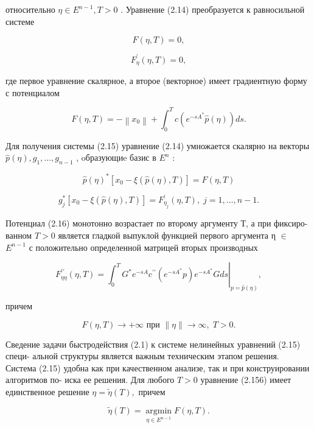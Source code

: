 \documentclass[10pt]{article}
\begin{document}
относительно \(\eta  \in  {E}^{n - 1},T > 0\) . Уравнение (2.14) преобразуется к равносильной системе

\[
F\left( {\eta ,T}\right)  = 0, \tag{2.15a}
\]

\[
{F}_{\eta }^{\prime }\left( {\eta ,T}\right)  = 0, \tag{2.156}
\]

где первое уравнение скалярное, а второе (векторное) имеет градиентную форму с потенциалом

\[
F\left( {\eta ,T}\right)  =  - \left\lVert {x}_{0} \right\rVert + {\int }_{0}^{T}c\left( {{e}^{-s{A}^{ * }}\widehat{p}\left( \eta \right) }\right) {ds}. \tag{2.16}
\]

Для получения системы (2.15) уравнение (2.14) умножается скалярно на векторы \(\widehat{p}\left( \eta \right) ,{g}_{1},\ldots ,{g}_{n - 1}\) , oбразующиe базис в \({E}^{n}\) :

\[
\widehat{p}{\left( \eta \right) }^{ * }\left[  {{x}_{0} - \xi \left( {\widehat{p}\left( \eta \right) ,T}\right) }\right]   = F\left( {\eta ,T}\right)
\]

\[
{g}_{j}^{ * }\left[  {{x}_{0} - \xi \left( {\widehat{p}\left( \eta \right) ,T}\right) }\right]   = {F}_{{\eta }_{j}}^{\prime }\left( {\eta ,T}\right) ,\;j = 1,\ldots ,n - 1.
\]

Потенциал (2.16) монотонно возрастает по второму аргументу Т, а при фиксиро- ванном \(T > 0\) является гладкой выпуклой функцией первого аргумента η \(\in\) \({E}^{n - 1}\) с положительно определенной матрицей вторых производных

\[
{F}_{\eta \eta }^{\prime \prime }\left( {\eta ,T}\right)  = {\left. {\int }_{0}^{T}{G}^{ * }{e}^{-{sA}}{c}^{\prime \prime }\left( {e}^{-s{A}^{ * }}p\right) {e}^{-s{A}^{ * }}Gds\right| }_{p = \widehat{p}\left( \eta \right) },
\]

причем

\[
F\left( {\eta ,T}\right)  \rightarrow   + \infty \text{ при }\parallel \eta \parallel  \rightarrow  \infty ,\;T > 0.
\]

Сведение задачи быстродействия (2.1) к системе нелинейных уравнений (2.15) специ- альной структуры является важным техническим этапом решения. Система (2.15) удобна как при качественном анализе, так и при конструировании алгоритмов по- иска ее решения. Для любого \(T > 0\) уравнение (2.156) имеет единственное решение \(\eta  = \widetilde{\eta }\left( T\right) ,\) причем

\[
\widetilde{\eta }\left( T\right)  = \mathop{\operatorname{argmin}}\limits_{{\eta  \in  {E}^{n - 1}}}F\left( {\eta ,T}\right) . \tag{2.17}
\]
\end{document}
